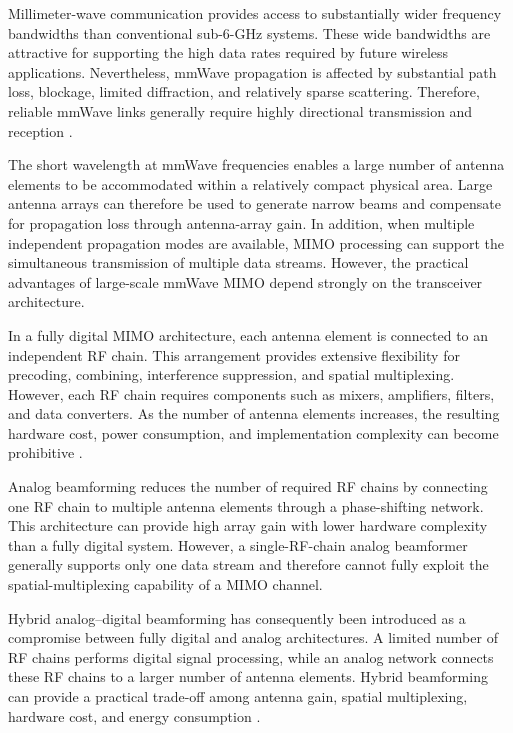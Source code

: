 Millimeter-wave communication provides access to substantially wider
frequency bandwidths than conventional sub-6-GHz systems. These wide
bandwidths are attractive for supporting the high data rates required
by future wireless applications. Nevertheless, mmWave propagation is
affected by substantial path loss, blockage, limited diffraction, and
relatively sparse scattering. Therefore, reliable mmWave links
generally require highly directional transmission and reception
\cite{Guo2026,Payami2020}.

The short wavelength at mmWave frequencies enables a large number of
antenna elements to be accommodated within a relatively compact
physical area. Large antenna arrays can therefore be used to generate
narrow beams and compensate for propagation loss through antenna-array
gain. In addition, when multiple independent propagation modes are
available, MIMO processing can support the simultaneous transmission
of multiple data streams. However, the practical advantages of
large-scale mmWave MIMO depend strongly on the transceiver
architecture.

In a fully digital MIMO architecture, each antenna element is connected
to an independent RF chain. This arrangement provides extensive
flexibility for precoding, combining, interference suppression, and
spatial multiplexing. However, each RF chain requires components such
as mixers, amplifiers, filters, and data converters. As the number of
antenna elements increases, the resulting hardware cost, power
consumption, and implementation complexity can become prohibitive
\cite{Payami2020,Zeng2018}.

Analog beamforming reduces the number of required RF chains by
connecting one RF chain to multiple antenna elements through a
phase-shifting network. This architecture can provide high array gain
with lower hardware complexity than a fully digital system. However,
a single-RF-chain analog beamformer generally supports only one data
stream and therefore cannot fully exploit the spatial-multiplexing
capability of a MIMO channel.

Hybrid analog--digital beamforming has consequently been introduced as
a compromise between fully digital and analog architectures. A
limited number of RF chains performs digital signal processing, while
an analog network connects these RF chains to a larger number of
antenna elements. Hybrid beamforming can provide a practical trade-off
among antenna gain, spatial multiplexing, hardware cost, and energy
consumption \cite{Payami2020}.

